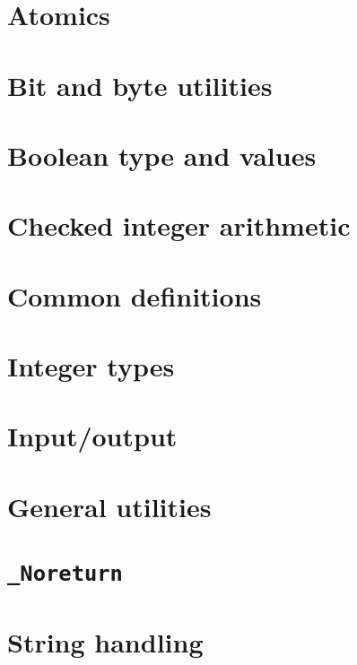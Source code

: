 \section{Atomics }


\section{Bit and byte utilities }


\section{Boolean type and values }


\section{Checked integer arithmetic }


\section{Common definitions }


\section{Integer types }


\section{Input/output }


\section{General utilities }


\section{\tt{_Noreturn} }


\section{String handling }


